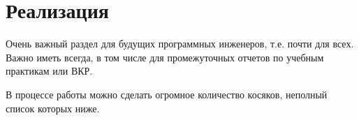 % 


% 





\section{Реализация}
Очень важный раздел для будущих программных инженеров, т.е. почти для всех. Важно иметь всегда, в том числе для промежуточных отчетов по учебным практикам или ВКР.

В процессе работы можно сделать огромное количество косяков, неполный список которых ниже.

